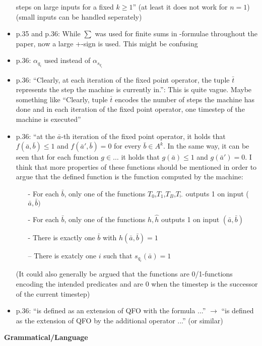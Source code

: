 \begin{itemize}
steps on large
inputs for a fixed $k \geq 1$'' (at least it does not work for $n = 1$) (small inputs can be handled
seperately)
\item p.35 and p.36: While $\sum$ was used for finite sums in \qso-formulae throughout the paper, now
a large +-sign is used. This might be confusing
\item p.36: $\alpha_{q_i}$ used instead of $\alpha_{s_{q_{i}}}$
\item p.36: ``Clearly, at each iteration of the fixed point operator, the tuple $\bar{t}$ represents the step the
machine is currently in.'': This is quite vague. Maybe something like ``Clearly, tuple $\bar{t}$ encodes
the number of steps the machine has done and in each iteration of the fixed point operator,
one timestep of the machine is executed''
\item p.36: ``at the $\bar{a}$-th iteration of the fixed point operator, it holds that $f(\bar{a}, \bar{b}) \leq 1$ and $f(\bar{a}', \bar{b}) = 0$ for every $\bar{b} \in A^k$. 
In the same way, it can be seen that for each function $g \in \ldots$ it holds that $g(\bar{a}) \leq 1$ and $g(\bar{a}')= 0$. 
I think that more properties of these functions should be mentioned
in order to argue that the defined function is the function computed by the machine:
\begin{itemize}
\item[-] For each $\bar{b}$, only one of the functions $T_0$,$T_1$,$T_B$,$T_{\vdash}$ outputs 1 on input ($\bar{a}, \bar{b})$
\item[-] For each $\bar{b}$, only one of the functions $h,\hat{h}$ outputs 1 on input $(\bar{a}, \bar{b})$
\item[-] There is exactly one $\bar{b}$ with $h(\bar{a}, \bar{b}) = 1$
\item[–] There is exatcly one $i$ such that $s_{q_i}(\bar{a}) = 1$
\end{itemize}
(It could also generally be argued that the functions are 0/1-functions encoding the intended
predicates and are 0 when the timestep is the successor of the current timestep)
\item p.36: ``is defined as an extension of QFO with the formula ...'' $\to$	 ``is defined as the extension
of QFO by the additional operator ...'' (or similar)
\end{itemize}
\vspace{1em}
{\bf Grammatical/Language}
